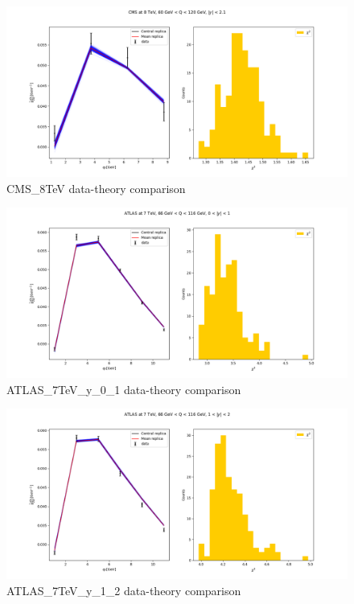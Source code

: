 \documentclass[
]{article}
\begin{document}
\begin{figure}
\centering
\includegraphics{pngplots/CMS_8TeV.png}
\caption{CMS\_8TeV data-theory comparison}
\end{figure}

\begin{figure}
\centering
\includegraphics{pngplots/ATLAS_7TeV_y_0_1.png}
\caption{ATLAS\_7TeV\_y\_0\_1 data-theory comparison}
\end{figure}

\begin{figure}
\centering
\includegraphics{pngplots/ATLAS_7TeV_y_1_2.png}
\caption{ATLAS\_7TeV\_y\_1\_2 data-theory comparison}
\end{figure}
\end{document}
